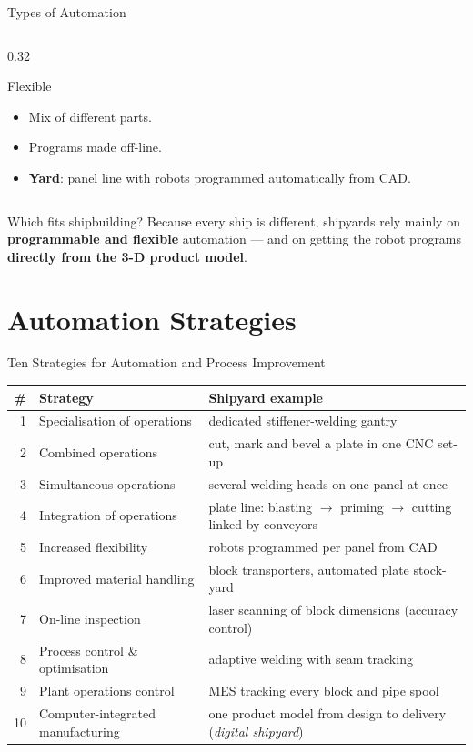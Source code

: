 \documentclass[aspectratio=169]{beamer}
\begin{document}
\begin{frame}{Types of Automation}
\begin{columns}[T]
\begin{column}{0.32\textwidth}
\begin{block}{Flexible}
					\begin{itemize}\small
						\item Mix of different parts.
						\item Programs made off-line.
						\item \textbf{Yard}: panel line with robots programmed automatically from CAD.
					\end{itemize}
				\end{block}
			\end{column}
		\end{columns}
		\vspace{0.3cm}
		\begin{block}{Which fits shipbuilding?}
			\small Because every ship is different, shipyards rely mainly on \textbf{programmable and flexible} automation --- and on getting the robot programs \textbf{directly from the 3-D product model}.
		\end{block}
	\end{frame}

	\section{Automation Strategies}
	\begin{frame}{Ten Strategies for Automation and Process Improvement}
		\renewcommand{\arraystretch}{1.12}
		\centering
		\footnotesize
		\begin{tabular}{@{}rp{5.0cm}p{7.4cm}@{}}
			\toprule
			\textbf{\#} & \textbf{Strategy} & \textbf{Shipyard example} \\
			\midrule
			1  & Specialisation of operations    & dedicated stiffener-welding gantry \\
			2  & Combined operations              & cut, mark and bevel a plate in one CNC set-up \\
			3  & Simultaneous operations          & several welding heads on one panel at once \\
			4  & Integration of operations        & plate line: blasting $\to$ priming $\to$ cutting linked by conveyors \\
			5  & Increased flexibility            & robots programmed per panel from CAD \\
			6  & Improved material handling       & block transporters, automated plate stock-yard \\
			7  & On-line inspection               & laser scanning of block dimensions (accuracy control) \\
			8  & Process control \& optimisation  & adaptive welding with seam tracking \\
			9  & Plant operations control         & MES tracking every block and pipe spool \\
			10 & Computer-integrated manufacturing & one product model from design to delivery (\emph{digital shipyard}) \\
			\bottomrule
		\end{tabular}
	\end{frame}
\end{document}
